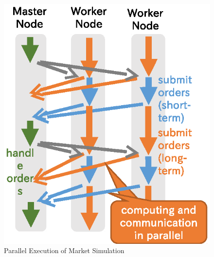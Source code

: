 \begin{figure}
  \centering
  \includegraphics[width=.8\linewidth]{Figs.noda/figure-06.market_para.eps}
  \caption{Parallel Execution of Market Simulation}
  \label{fig:Figs.noda/figure-06.market_para.eps}
\end{figure}

